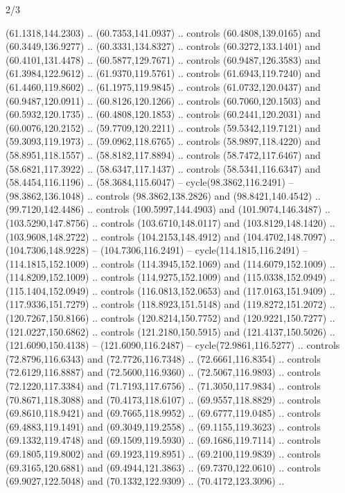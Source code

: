 \begin{flagdescription}{2/3}
\begin{scope}[shift={(0.5\flaglength,0.5)},scale=\flagwidth/320]
\begin{scope}[y=0.8pt, x=0.8pt, yscale=-1,shift={(-118.3,-146)}]
  (61.1318,144.2303) .. (60.7353,141.0937) .. controls (60.4808,139.0165) and
  (60.3449,136.9277) .. (60.3331,134.8327) .. controls (60.3272,133.1401) and
  (60.4101,131.4478) .. (60.5877,129.7671) .. controls (60.9487,126.3583) and
  (61.3984,122.9612) .. (61.9370,119.5761) .. controls (61.6943,119.7240) and
  (61.4460,119.8602) .. (61.1975,119.9845) .. controls (61.0732,120.0437) and
  (60.9487,120.0911) .. (60.8126,120.1266) .. controls (60.7060,120.1503) and
  (60.5932,120.1735) .. (60.4808,120.1853) .. controls (60.2441,120.2031) and
  (60.0076,120.2152) .. (59.7709,120.2211) .. controls (59.5342,119.7121) and
  (59.3093,119.1973) .. (59.0962,118.6765) .. controls (58.9897,118.4220) and
  (58.8951,118.1557) .. (58.8182,117.8894) .. controls (58.7472,117.6467) and
  (58.6821,117.3922) .. (58.6347,117.1437) .. controls (58.5341,116.6347) and
  (58.4454,116.1196) .. (58.3684,115.6047) -- cycle(98.3862,116.2491) --
  (98.3862,136.1048) .. controls (98.3862,138.2826) and (98.8421,140.4542) ..
  (99.7120,142.4486) .. controls (100.5997,144.4903) and (101.9074,146.3487) ..
  (103.5290,147.8756) .. controls (103.6710,148.0117) and (103.8129,148.1420) ..
  (103.9608,148.2722) .. controls (104.2153,148.4912) and (104.4702,148.7097) ..
  (104.7306,148.9228) -- (104.7306,116.2491) -- cycle(114.1815,116.2491) --
  (114.1815,152.1009) .. controls (114.3945,152.1069) and (114.6079,152.1009) ..
  (114.8209,152.1009) .. controls (114.9275,152.1009) and (115.0338,152.0949) ..
  (115.1404,152.0949) .. controls (116.0813,152.0653) and (117.0163,151.9409) ..
  (117.9336,151.7279) .. controls (118.8923,151.5148) and (119.8272,151.2072) ..
  (120.7267,150.8166) .. controls (120.8214,150.7752) and (120.9221,150.7277) ..
  (121.0227,150.6862) .. controls (121.2180,150.5915) and (121.4137,150.5026) ..
  (121.6090,150.4138) -- (121.6090,116.2487) -- cycle(72.9861,116.5277) ..
  controls (72.8796,116.6343) and (72.7726,116.7348) .. (72.6661,116.8354) ..
  controls (72.6129,116.8887) and (72.5600,116.9360) .. (72.5067,116.9893) ..
  controls (72.1220,117.3384) and (71.7193,117.6756) .. (71.3050,117.9834) ..
  controls (70.8671,118.3088) and (70.4173,118.6107) .. (69.9557,118.8829) ..
  controls (69.8610,118.9421) and (69.7665,118.9952) .. (69.6777,119.0485) ..
  controls (69.4883,119.1491) and (69.3049,119.2558) .. (69.1155,119.3623) ..
  controls (69.1332,119.4748) and (69.1509,119.5930) .. (69.1686,119.7114) ..
  controls (69.1805,119.8002) and (69.1923,119.8951) .. (69.2100,119.9839) ..
  controls (69.3165,120.6881) and (69.4944,121.3863) .. (69.7370,122.0610) ..
  controls (69.9027,122.5048) and (70.1332,122.9309) .. (70.4172,123.3096) ..

\end{scope}
\end{scope}
\end{flagdescription}
